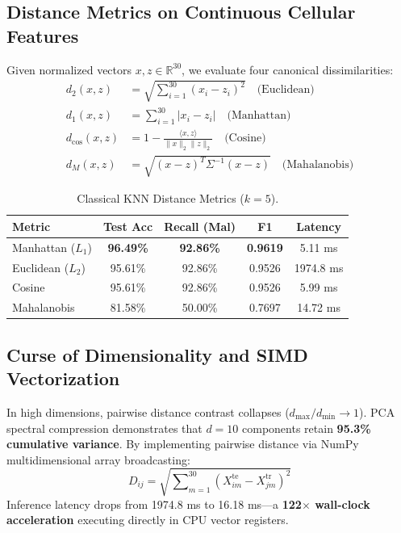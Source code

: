 \documentclass[10pt,twocolumn,letterpaper]{article}
\begin{document}
\subsection{Distance Metrics on Continuous Cellular Features}
Given normalized vectors $x, z \in \mathbb{R}^{30}$, we evaluate four canonical dissimilarities:
\begin{align}
d_2(x, z) &= \sqrt{\sum\nolimits_{i=1}^{30} (x_i - z_i)^2} \quad \text{(Euclidean)} \\
d_1(x, z) &= \sum\nolimits_{i=1}^{30} |x_i - z_i| \quad \text{(Manhattan)} \\
d_{\text{cos}}(x, z) &= 1 - \frac{\langle x, z \rangle}{\|x\|_2 \|z\|_2} \quad \text{(Cosine)} \\
d_M(x, z) &= \sqrt{(x - z)^T \Sigma^{-1} (x - z)} \quad \text{(Mahalanobis)}
\end{align}

\begin{table}[h]
\centering
\caption{Classical KNN Distance Metrics ($k=5$).}
\small
\begin{tabular}{lcccc}
\toprule
Metric & Test Acc & Recall (Mal) & F1 & Latency \\
\midrule
Manhattan ($L_1$) & \textbf{96.49\%} & \textbf{92.86\%} & \textbf{0.9619} & 5.11 ms \\
Euclidean ($L_2$) & 95.61\% & 92.86\% & 0.9526 & 1974.8 ms \\
Cosine & 95.61\% & 92.86\% & 0.9526 & 5.99 ms \\
Mahalanobis & 81.58\% & 50.00\% & 0.7697 & 14.72 ms \\
\bottomrule
\end{tabular}
\end{table}

\subsection{Curse of Dimensionality and SIMD Vectorization}
In high dimensions, pairwise distance contrast collapses ($d_{\max}/d_{\min} \to 1$). PCA spectral compression demonstrates that $d=10$ components retain \textbf{95.3\% cumulative variance}. By implementing pairwise distance via NumPy multidimensional array broadcasting:
\begin{equation}
D_{ij} = \sqrt{\sum\nolimits_{m=1}^{30} (X^{\text{te}}_{im} - X^{\text{tr}}_{jm})^2}
\end{equation}
Inference latency drops from 1974.8 ms to 16.18 ms—a \textbf{122$\times$ wall-clock acceleration} executing directly in CPU vector registers.
\end{document}

